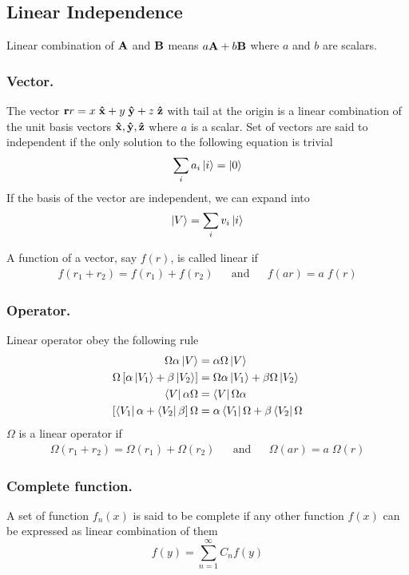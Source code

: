 \documentclass[../main.tex]{subfiles}
\begin{document}
\subsection{Linear Independence}
Linear combination of $\mathbf{A}$ and $\mathbf{B}$ means $a\mathbf{A} + b\mathbf{B}$ where $a$ and $b$ are scalars.

\subsubsection{Vector.}
The vector $\mathbf{r}r = x\;\mathbf{\hat{x}}+y\;\mathbf{\hat{y}}+z\;\mathbf{\hat{z}}$ with tail at the origin is a linear combination of the unit basis vectors $\mathbf{\hat{x}},\mathbf{\hat{y}},\mathbf{\hat{z}}$
where $a$ is a scalar.
Set of vectors are said to independent if the only solution to the following equation is trivial
\begin{equation*}
	\sum_i a_i\ket{i}=\ket{0}
\end{equation*}
If the basis of the vector are independent, we can expand into
\begin{equation*}
	\ket{V}=\sum_i v_i \ket{i}
\end{equation*}

A function of a vector, say $f (r)$, is called linear if
\begin{align*}
	f(r_1+r_2)= f(r_1)+ f(r_2) &  & \mathrm{and} &  & f(ar)=a\;f(r)
\end{align*}

\subsubsection{Operator.}
Linear operator obey the following rule
\begin{align*}
	\Omega \alpha \ket{V}                               & =\alpha\Omega \ket{V}                         \\
	\Omega\left[\alpha \ket{V_1}+\beta \ket{V_2}\right] & =\Omega\alpha \ket{V_1}+\beta\Omega \ket{V_2} \\
	\bra{V}\alpha\Omega                                 & =\bra{V}\Omega\alpha                          \\
	\left[\bra{V_1}\alpha+\bra{V_2}\beta\right]\Omega   & =\alpha \bra{V_1}\Omega +\beta\bra{V_2}\Omega
\end{align*}
$\Omega$ is a linear operator if
\begin{align*}
	\Omega(r_1+r_2)= \Omega(r_1)+ \Omega(r_2) &  & \mathrm{and} &  & \Omega(ar)=a\;\Omega(r)
\end{align*}

\subsubsection{Complete function.} 
A set of function $f_n(x)$ is said to be complete if any other function $f(x)$ can be expressed as linear combination of them
\begin{equation*}
	f(y)=\sum_{n=1}^{\infty} C_nf(y)
\end{equation*}
\end{document}
